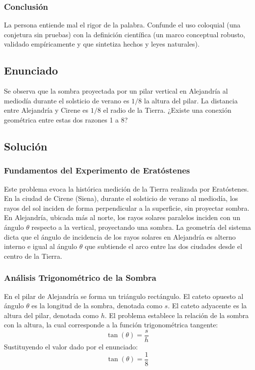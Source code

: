 \documentclass[12pt,letterpaper]{article}
\begin{document}
\subsubsection*{Conclusión}
La persona entiende mal el rigor de la palabra. Confunde el uso coloquial (una conjetura sin pruebas) con la definición científica (un marco conceptual robusto, validado empíricamente y que sintetiza hechos y leyes naturales).

\newpage

\subsection*{Enunciado}
Se observa que la sombra proyectada por un pilar vertical en Alejandría al mediodía durante el solsticio de verano es $1/8$ la altura del pilar. La distancia entre Alejandría y Cirene es $1/8$ el radio de la Tierra. ¿Existe una conexión geométrica entre estas dos razones 1 a 8?

\subsection*{Solución}

\subsubsection*{Fundamentos del Experimento de Eratóstenes}
Este problema evoca la histórica medición de la Tierra realizada por Eratóstenes. En la ciudad de Cirene (Siena), durante el solsticio de verano al mediodía, los rayos del sol inciden de forma perpendicular a la superficie, sin proyectar sombra. En Alejandría, ubicada más al norte, los rayos solares paralelos inciden con un ángulo $\theta$ respecto a la vertical, proyectando una sombra. La geometría del sistema dicta que el ángulo de incidencia de los rayos solares en Alejandría es alterno interno e igual al ángulo $\theta$ que subtiende el arco entre las dos ciudades desde el centro de la Tierra.

\subsubsection*{Análisis Trigonométrico de la Sombra}
En el pilar de Alejandría se forma un triángulo rectángulo. El cateto opuesto al ángulo $\theta$ es la longitud de la sombra, denotada como $s$. El cateto adyacente es la altura del pilar, denotada como $h$. El problema establece la relación de la sombra con la altura, la cual corresponde a la función trigonométrica tangente:
$$\tan(\theta)=\frac{s}{h}$$
Sustituyendo el valor dado por el enunciado:
$$\tan(\theta)=\frac{1}{8}$$
\end{document}
